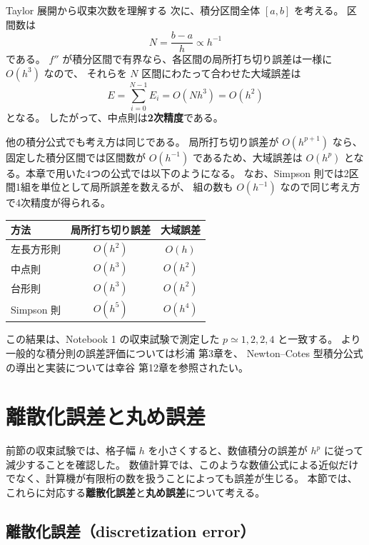 \begin{topicblock}{Taylor 展開から収束次数を理解する}
次に、積分区間全体 $[a,b]$ を考える。
区間数は
\begin{equation}
 N=\frac{b-a}{h}\propto h^{-1}
\end{equation}
である。
$f''$ が積分区間で有界なら、各区間の局所打ち切り誤差は一様に $O(h^3)$ なので、
それらを $N$ 区間にわたって合わせた大域誤差は
\begin{equation}
 E
 =\sum_{i=0}^{N-1}E_i
 =O(Nh^3)
 =O(h^2)
\end{equation}
となる。
したがって、中点則は\textbf{2次精度}である。

他の積分公式でも考え方は同じである。
局所打ち切り誤差が $O(h^{p+1})$ なら、固定した積分区間では区間数が
$O(h^{-1})$ であるため、大域誤差は $O(h^p)$ となる。本章で用いた4つの公式では以下のようになる。
なお、Simpson 則では2区間1組を単位として局所誤差を数えるが、
組の数も $O(h^{-1})$ なので同じ考え方で4次精度が得られる。
\begin{center}
\begin{tabular}{lcc}
\toprule
方法 & 局所打ち切り誤差 & 大域誤差 \\
\midrule
左長方形則 & $O(h^2)$ & $O(h)$ \\
中点則 & $O(h^3)$ & $O(h^2)$ \\
台形則 & $O(h^3)$ & $O(h^2)$ \\
Simpson 則 & $O(h^5)$ & $O(h^4)$ \\
\bottomrule
\end{tabular}
\end{center}

この結果は、Notebook 1 の収束試験で測定した
$p\simeq1,2,2,4$ と一致する。
より一般的な積分則の誤差評価については杉浦 第3章\cite{sugiura2009}を、
Newton--Cotes 型積分公式の導出と実装については幸谷 第12章\cite{kouya2021}を参照されたい。
\end{topicblock}

\section{離散化誤差と丸め誤差}
\label{sec:ch1-roundoff}

前節の収束試験では、格子幅 $h$ を小さくすると、数値積分の誤差が $h^p$ に従って減少することを確認した。
数値計算では、このような数値公式による近似だけでなく、計算機が有限桁の数を扱うことによっても誤差が生じる。
本節では、これらに対応する\textbf{離散化誤差}と\textbf{丸め誤差}について考える。

\subsection{離散化誤差（discretization error）}

